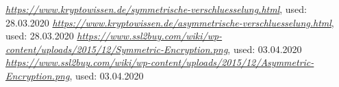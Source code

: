 \documentclass{article}
\begin{document}
\begin{thebibliography}{9}
     \emph{\url{https://www.kryptowissen.de/symmetrische-verschluesselung.html}}, used: 28.03.2020
     \emph{\url{https://www.kryptowissen.de/asymmetrische-verschluesselung.html}}, used: 28.03.2020
     \emph{\url{https://www.ssl2buy.com/wiki/wp-content/uploads/2015/12/Symmetric-Encryption.png}}, used: 03.04.2020
     \emph{\url{https://www.ssl2buy.com/wiki/wp-content/uploads/2015/12/Asymmetric-Encryption.png}}, used: 03.04.2020
\end{thebibliography}
\end{document}
